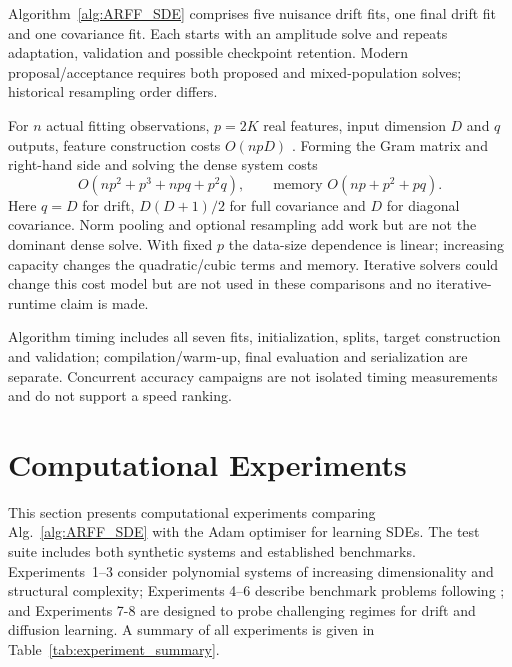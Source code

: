 \documentclass{article}
\begin{document}
Algorithm~\ref{alg:ARFF_SDE} comprises five nuisance drift fits, one final drift fit and one covariance fit. Each starts with an amplitude solve and repeats adaptation, validation and possible checkpoint retention. Modern proposal/acceptance requires both proposed and mixed-population solves; historical resampling order differs.

For $n$ actual fitting observations, $p=2K$ real features, input dimension $D$ and $q$ outputs, feature construction costs $O(npD)$ \citep{RR2007RandomFF}. Forming the Gram matrix and right-hand side and solving the dense system costs
\[
O(np^2+p^3+npq+p^2q),\qquad\text{memory }O(np+p^2+pq).
\]
Here $q=D$ for drift, $D(D+1)/2$ for full covariance and $D$ for diagonal covariance. Norm pooling and optional resampling add work but are not the dominant dense solve. With fixed $p$ the data-size dependence is linear; increasing capacity changes the quadratic/cubic terms and memory. Iterative solvers could change this cost model but are not used in these comparisons and no iterative-runtime claim is made.

Algorithm timing includes all seven fits, initialization, splits, target construction and validation; compilation/warm-up, final evaluation and serialization are separate. Concurrent accuracy campaigns are not isolated timing measurements and do not support a speed ranking.

\section{Computational Experiments}
\label{sec:computational_experiments}%

This section presents computational experiments comparing Alg.~\ref{alg:ARFF_SDE} with the Adam optimiser for learning SDEs. The test suite includes both synthetic systems and established benchmarks. Experiments~1--3 consider polynomial systems of increasing dimensionality and structural complexity; Experiments 4--6 describe benchmark problems following \cite{Dietrich2023}; and Experiments 7-8 are designed to probe challenging regimes for drift and diffusion learning. A summary of all experiments is given in Table~\ref{tab:experiment_summary}.
\end{document}
